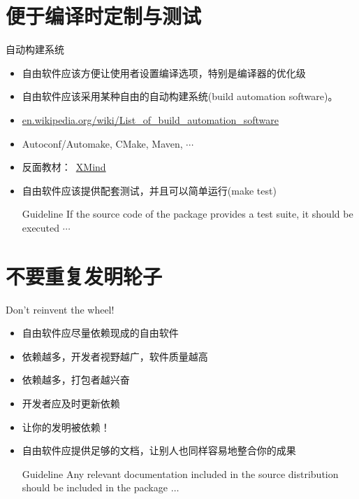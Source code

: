 \documentclass[handout,CJK,xetex]{beamer}
\begin{document}
\section{便于编译时定制与测试}
\begin{frame}{自动构建系统}
  \begin{itemize}[<+->]
  \item 自由软件应该方便让使用者设置编译选项，特别是编译器的优化级
  \item 自由软件应该采用某种自由的自动构建系统(build automation software)。
  \item \url{en.wikipedia.org/wiki/List_of_build_automation_software}
  \item Autoconf/Automake, CMake, Maven, $\cdots$
  \item 反面教材：~\href{http://www.xmind.net/}{XMind}
  \item 自由软件应该提供配套测试，并且可以简单运行(make test)
    \begin{block}{Guideline}
      If the source code of the package provides a test suite, it should be executed $\cdots$
    \end{block}
  \end{itemize}
\end{frame}

\section{不要重复发明轮子}
\begin{frame}{Don't reinvent the wheel!}
  \begin{itemize}[<+->]
  \item 自由软件应尽量依赖现成的自由软件
  \item 依赖越多，开发者视野越广，软件质量越高
  \item 依赖越多，打包者越兴奋
  \item 开发者应及时更新依赖
  \item 让你的发明被依赖！
  \item 自由软件应提供足够的文档，让别人也同样容易地整合你的成果
    \begin{block}{Guideline}
Any relevant documentation included in the source distribution should be included in the package $\ldots$
    \end{block}
  \end{itemize}
\end{frame}
\end{document}
